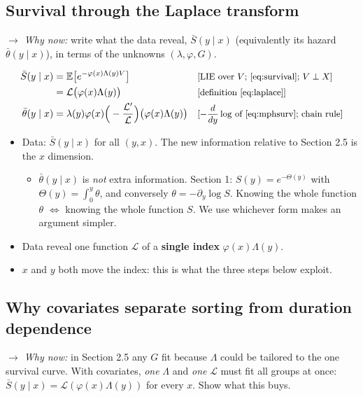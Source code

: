 \documentclass[11pt]{article}
\newcommand{\E}{\mathbb{E}}
\newcommand{\1}{\mathbf{1}}
\newcommand{\Lap}{\mathcal{L}}
\newcommand{\why}[1]{\text{\small[#1]}}
\newcommand{\whynow}[1]{\par\noindent\textit{$\rightarrow$ Why now:} #1\par}
\begin{document}
\subsection{Survival through the Laplace transform}
\whynow{write what the data reveal, $\bar S(y\mid x)$ (equivalently its hazard $\bar\theta(y\mid x)$), in terms of the unknowns $(\lambda,\varphi,G)$.}
\begin{align}
  \bar S(y\mid x) &= \E\big[e^{-\varphi(x)\Lambda(y)V}\big] && \why{LIE over $V$; \eqref{eq:survival}; $V\perp X$} \nonumber\\
  &= \Lap\big(\varphi(x)\Lambda(y)\big) && \why{definition \eqref{eq:laplace}} \label{eq:mphsurv}\\
  \bar\theta(y\mid x) &= \lambda(y)\varphi(x)\Big(-\frac{\Lap'}{\Lap}\Big)\big(\varphi(x)\Lambda(y)\big) && \why{$-\frac{d}{dy}\log$ of \eqref{eq:mphsurv}; chain rule} \label{eq:mphhazard}
\end{align}
\begin{itemize}
  \item Data: $\bar S(y\mid x)$ for all $(y,x)$. The new information relative to Section 2.5 is the $x$ dimension.
    \begin{itemize}
      \item $\bar\theta(y\mid x)$ is \emph{not} extra information. Section 1: $S(y)=e^{-\Theta(y)}$ with $\Theta(y)=\int_0^y\theta$, and conversely $\theta=-\partial_y\log S$. Knowing the whole function $\theta$ $\iff$ knowing the whole function $S$. We use whichever form makes an argument simpler.
    \end{itemize}
  \item Data reveal one function $\Lap$ of a \textbf{single index} $\varphi(x)\Lambda(y)$.
  \item $x$ and $y$ both move the index: this is what the three steps below exploit.
\end{itemize}

\subsection{Why covariates separate sorting from duration dependence}
\whynow{in Section 2.5 any $G$ fit because $\Lambda$ could be tailored to the one survival curve. With covariates, \emph{one} $\Lambda$ and \emph{one} $\Lap$ must fit all groups at once: $\bar S(y\mid x)=\Lap(\varphi(x)\Lambda(y))$ for every $x$. Show what this buys.}
\end{document}
